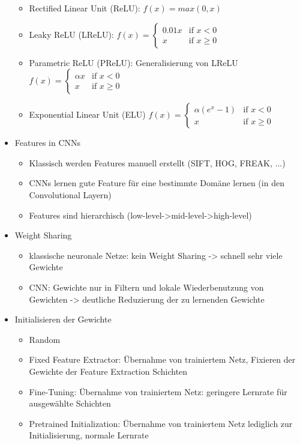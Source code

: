\documentclass[paper=a4, fontsize=11pt]{scrartcl} %
\numberwithin{equation}{section} %
\numberwithin{figure}{section} %
\numberwithin{table}{section} %
\begin{document}
\begin{itemize}
\begin{itemize}
\item Rectified Linear Unit (ReLU): $f(x) = max(0,x)$
\item Leaky ReLU (LReLU): $f(x) =
\begin{cases}
0.01 x & \text{if } x < 0\\
x & \text{if } x \ge 0
\end{cases}$
\item Parametric ReLU (PReLU): Generalisierung von LReLU $f(x) =
\begin{cases}
\alpha x & \text{if } x < 0\\
x & \text{if } x \ge 0
\end{cases}$
\item Exponential Linear Unit (ELU) $f(x) =
\begin{cases}
\alpha (e^x-1) & \text{if } x < 0\\
x & \text{if } x \ge 0
\end{cases}$
\end{itemize}
\item Features in CNNs
\begin{itemize}
\item Klassisch werden Features manuell erstellt (SIFT, HOG, FREAK, ...)
\item CNNs lernen gute Feature für eine bestimmte Domäne lernen (in den Convolutional Layern)
\item Features sind hierarchisch (low-level->mid-level->high-level)
\end{itemize}
\item Weight Sharing
\begin{itemize}
\item klassische neuronale Netze: kein Weight Sharing -> schnell sehr viele Gewichte
\item CNN: Gewichte nur in Filtern und lokale Wiederbenutzung von Gewichten -> deutliche Reduzierung der zu lernenden Gewichte
\end{itemize}
\item Initialisieren der Gewichte
\begin{itemize}
\item Random
\item Fixed Feature Extractor: Übernahme von trainiertem Netz, Fixieren der Gewichte der Feature Extraction Schichten
\item Fine-Tuning: Übernahme von trainiertem Netz: geringere Lernrate für ausgewählte Schichten
\item Pretrained Initialization: Übernahme von trainiertem Netz lediglich zur Initialisierung, normale Lernrate

\end{itemize}
\end{itemize}
\end{document}
